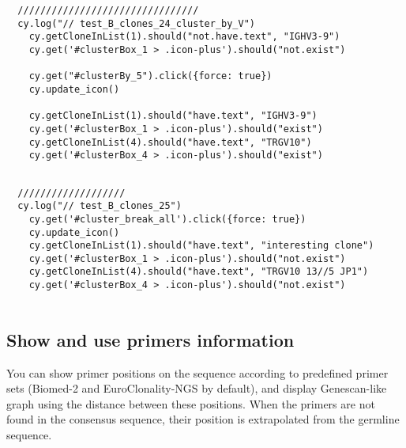 \begin{verbatim}
  ////////////////////////////////
  cy.log("// test_B_clones_24_cluster_by_V")
    cy.getCloneInList(1).should("not.have.text", "IGHV3-9")
    cy.get('#clusterBox_1 > .icon-plus').should("not.exist")

    cy.get("#clusterBy_5").click({force: true})
    cy.update_icon()

    cy.getCloneInList(1).should("have.text", "IGHV3-9")
    cy.get('#clusterBox_1 > .icon-plus').should("exist")
    cy.getCloneInList(4).should("have.text", "TRGV10")
    cy.get('#clusterBox_4 > .icon-plus').should("exist")


\end{verbatim}

\begin{verbatim}
  ///////////////////
  cy.log("// test_B_clones_25")
    cy.get('#cluster_break_all').click({force: true})
    cy.update_icon()
    cy.getCloneInList(1).should("have.text", "interesting clone")
    cy.get('#clusterBox_1 > .icon-plus').should("not.exist")
    cy.getCloneInList(4).should("have.text", "TRGV10 13//5 JP1")
    cy.get('#clusterBox_4 > .icon-plus').should("not.exist")


\end{verbatim}

\subsection{Show and use primers information}

You can show primer positions on the sequence according to predefined primer sets 
(Biomed-2 and EuroClonality-NGS by default), and display Genescan-like graph 
using the distance between these positions.
When the primers are not found in the consensus sequence, their position is
extrapolated from the germline sequence.

